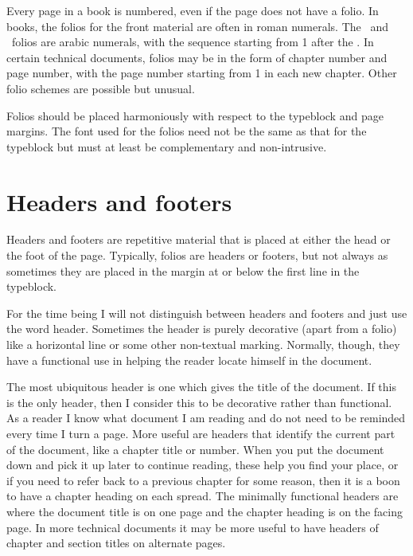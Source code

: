 \documentclass[10pt,letterpaper,extrafontsizes]{memoir}
\begin{document}
    Every page in a book is numbered, even if the page does not have a folio. 
In books, the folios for the front material are often in roman numerals.
The \pixmainmatter\ and \pixbackmatter\ folios are arabic numerals, 
with the sequence
starting from 1 after the \pixfrontmatter. In certain technical documents,
folios may be in the form of chapter number and 
page number, with the page number starting from 1 in each new chapter. 
Other folio schemes are possible but unusual.

    Folios should be placed harmoniously with respect to the 
typeblock and page margins. The font used for 
the folios need not be the same as that for the typeblock 
but must at least be complementary and non-intrusive.


\section{Headers and footers}

    Headers and footers are repetitive material that is placed at either 
the head or the foot of the page. Typically, folios are headers 
or footers, but not always as sometimes they are placed in the 
margin at or below the first line in the 
typeblock.

   For the time being I will not distinguish between headers and footers and 
just use the word header. Sometimes the header is purely decorative (apart
from a folio) like a horizontal line or some other non-textual 
marking. Normally, though, they have a functional use in helping the 
reader locate himself in the document.

    The most ubiquitous header is one which gives the title of the document.
If this is the only header, then I consider this to be decorative rather
than functional. As a reader I know what document I am reading and do not
need to be reminded every time I turn a page. More useful are headers that
identify the current part of the document, like a chapter 
title or number.
When you put the document down and pick it up later to continue reading, these
help you find your place, or if you need to refer back to a previous chapter
for some reason, then it is a boon to have a chapter heading 
on each 
spread. The minimally functional headers are where the document title
is on one page and the chapter heading is on the facing page. In more technical
documents it may be more useful to have headers of chapter and section titles
on alternate pages. 
\end{document}
